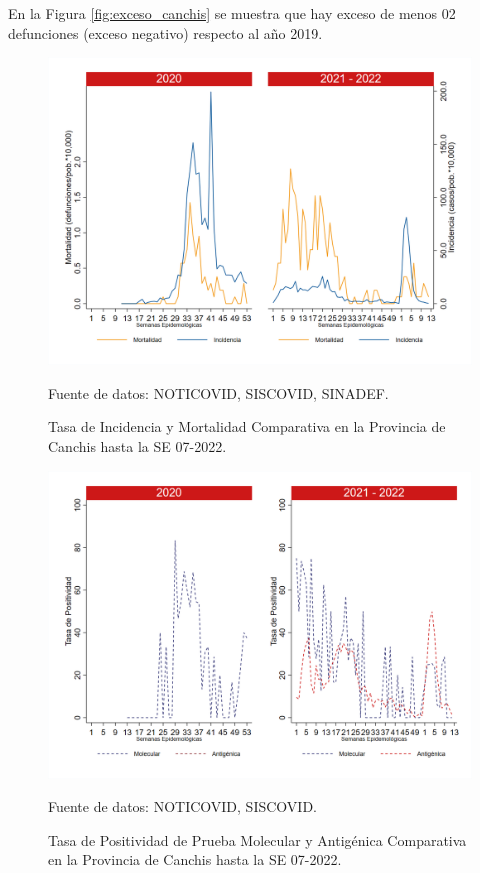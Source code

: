 \documentclass[12pt,a4paper,openany]{book}
\begin{document}
		En la Figura \ref{fig:exceso_canchis} se muestra que hay exceso de menos 02 defunciones (exceso negativo) respecto al año 2019.
		
		\begin{figure}[h]
			\caption{Tasa de Incidencia y Mortalidad Comparativa en la Provincia de Canchis hasta la SE 07-2022.}\label{fig:inc_mort_canchis}
			\begin{center}
				\includegraphics[width=0.85\linewidth]{../figuras/incidencia_mortalidad_20_21_5.png}
			\end{center}
			{\footnotesize {Fuente de datos: NOTICOVID, SISCOVID, SINADEF.}}
		\end{figure}
		
		\begin{figure}[h]
			\caption{Tasa de Positividad de Prueba Molecular y Antigénica Comparativa en la Provincia de Canchis hasta la SE 07-2022.}\label{fig:positividad_canchis}
			\begin{center}
				\includegraphics[width=0.7\linewidth]{../figuras/positividad_20_21_5.png}
			\end{center}
			{\footnotesize {Fuente de datos: NOTICOVID, SISCOVID.}}
		\end{figure}
		
\end{document}
